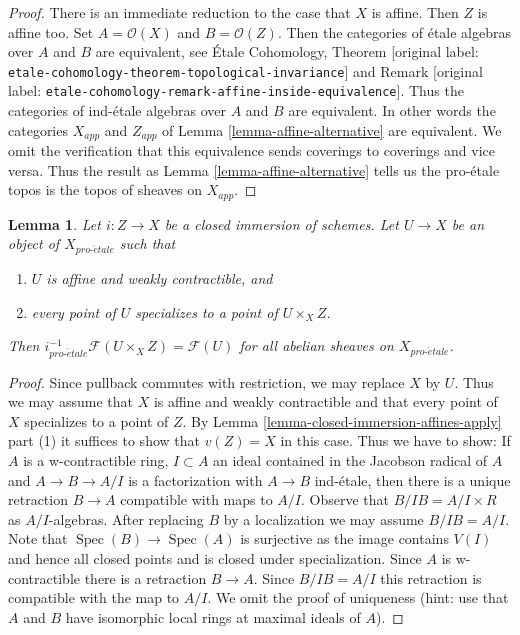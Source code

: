 \documentclass[10pt,a4paper]{article}
\theoremstyle{plain}
\newtheorem{lemma}[subsection]{Lemma}
\theoremstyle{definition}
\theoremstyle{remark}
\numberwithin{equation}{subsection}
\def\Spec{\mathop{\mathrm{Spec}}}
\def\proetale{{pro\text{-}\acute{e}tale}}
\begin{document}
\begin{proof}
There is an immediate reduction to the case that $X$ is affine.
Then $Z$ is affine too. Set $A = \mathcal{O}(X)$ and $B = \mathcal{O}(Z)$.
Then the categories of \'etale algebras over
$A$ and $B$ are equivalent, see 
\'Etale Cohomology, Theorem
\textnormal{[original label: \nolinkurl{etale-cohomology-theorem-topological-invariance}]} and
Remark \textnormal{[original label: \nolinkurl{etale-cohomology-remark-affine-inside-equivalence}]}.
Thus the categories of ind-\'etale algebras over $A$ and $B$ are
equivalent. In other words the categories $X_{app}$ and $Z_{app}$
of Lemma \ref{lemma-affine-alternative} are equivalent.
We omit the verification
that this equivalence sends coverings to coverings and vice versa.
Thus the result as Lemma \ref{lemma-affine-alternative}
tells us the pro-\'etale topos is the topos of sheaves on $X_{app}$.
\end{proof}

\begin{lemma}
\label{lemma-compute-i-star}
Let $i : Z \to X$ be a closed immersion of schemes.
Let $U \to X$ be an object of $X_\proetale$ such that
\begin{enumerate}
\item $U$ is affine and weakly contractible, and
\item every point of $U$ specializes to a point of $U \times_X Z$.
\end{enumerate}
Then $i_\proetale^{-1}\mathcal{F}(U \times_X Z) = \mathcal{F}(U)$
for all abelian sheaves on $X_\proetale$.
\end{lemma}

\begin{proof}
Since pullback commutes with restriction, we may replace $X$ by $U$.
Thus we may assume that $X$ is affine and weakly contractible
and that every point of $X$ specializes to a point of $Z$.
By Lemma \ref{lemma-closed-immersion-affines-apply} part (1)
it suffices to show that $v(Z) = X$ in this case.
Thus we have to show: If $A$ is a w-contractible ring, $I \subset A$
an ideal contained in the Jacobson radical of $A$ and $A \to B \to A/I$
is a factorization with $A \to B$ ind-\'etale, then there is
a unique retraction $B \to A$ compatible with maps to $A/I$.
Observe that $B/IB = A/I \times R$ as $A/I$-algebras.
After replacing $B$ by a localization we may assume $B/IB = A/I$.
Note that $\Spec(B) \to \Spec(A)$ is surjective as the image
contains $V(I)$ and hence all closed points and is closed under
specialization. Since $A$ is w-contractible there is a retraction $B \to A$.
Since $B/IB = A/I$ this retraction is compatible with the map to $A/I$.
We omit the proof of uniqueness (hint: use that $A$ and $B$ have
isomorphic local rings at maximal ideals of $A$).
\end{proof}
\end{document}
